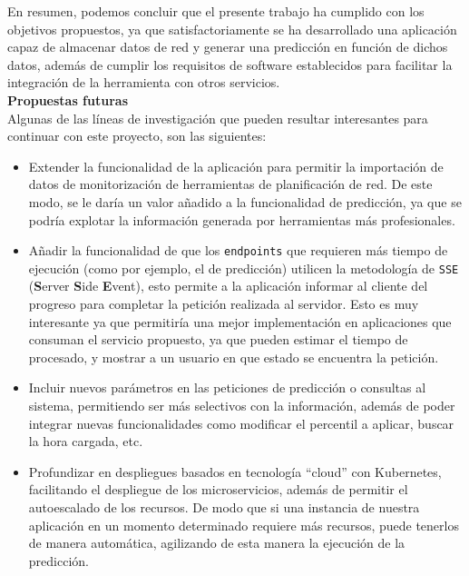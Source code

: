 \documentclass[a4paper, oneside, 12pt]{book}
\begin{document}
	\noindent En resumen, podemos concluir que el presente trabajo ha cumplido con los objetivos propuestos, ya que satisfactoriamente se ha desarrollado una aplicación capaz de almacenar datos de red y generar una predicción en función de dichos datos, además de cumplir los requisitos de software establecidos para facilitar la integración de la herramienta con otros servicios. \\
	
	
	\noindent \textbf{\large Propuestas futuras} \\
	
	\noindent Algunas de las líneas de investigación que pueden resultar interesantes para continuar con este proyecto, son las siguientes:
	
	\begin{itemize}
		\item Extender la funcionalidad de la aplicación para permitir la importación de datos de monitorización de herramientas de planificación de red. De este modo, se le daría un valor añadido a la funcionalidad de predicción, ya que se podría explotar la información generada por herramientas más profesionales.
		
		\item Añadir la funcionalidad de que los \texttt{endpoints} que requieren más tiempo de ejecución (como por ejemplo, el de predicción) utilicen la metodología de \texttt{SSE} (\textbf{S}erver \textbf{S}ide \textbf{E}vent), esto permite a la aplicación informar al cliente del progreso para completar la petición realizada al servidor. Esto es muy interesante ya que permitiría una mejor implementación en aplicaciones que consuman el servicio propuesto, ya que pueden estimar el tiempo de procesado, y mostrar a un usuario en que estado se encuentra la petición.
		
		\item Incluir nuevos parámetros en las peticiones de predicción o consultas al sistema, permitiendo ser más selectivos con la información, además de poder integrar nuevas funcionalidades como modificar el percentil a aplicar, buscar la hora cargada, etc. 
		
		\item Profundizar en despliegues basados en tecnología ``cloud'' con Kubernetes, facilitando el despliegue de los microservicios, además de permitir el autoescalado de los recursos. De modo que si una instancia de nuestra aplicación en un momento determinado requiere más recursos, puede tenerlos de manera automática, agilizando de esta manera la ejecución de la predicción.
	\end{itemize}
	
\end{document}

